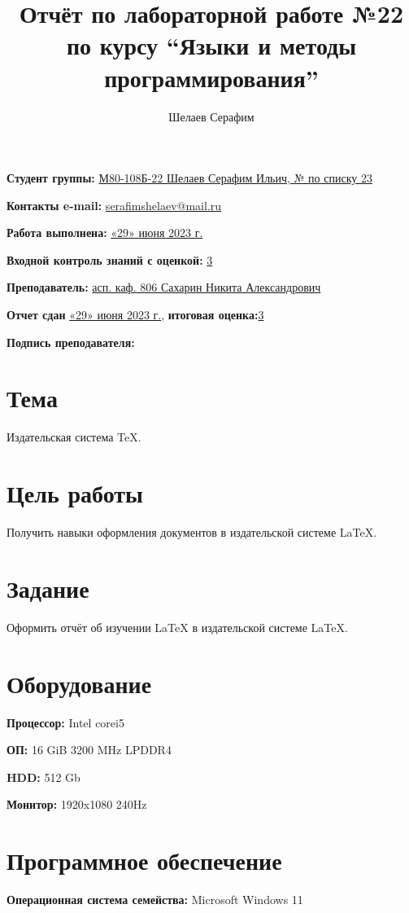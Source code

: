 \documentclass[12pt, letterpaper]{article}
\title{Отчёт по лабораторной работе №22 по курсу “Языки и методы программирования”}
\author{Шелаев Серафим}
\begin{document}
\maketitle
\begin{description}
\item\textbf{Студент группы:} \underline{М80-108Б-22 Шелаев Серафим Ильич, № по списку 23}    
\item\textbf{Контакты e-mail:} \underline{serafimshelaev@mail.ru}
\item\textbf{Работа выполнена:} \underline{«29» июня 2023 г.}
\item\textbf{Входной контроль знаний с оценкой:} \underline{3}
\item\textbf{Преподаватель:} \underline{асп. каф. 806 Сахарин Никита Александрович}
\item\textbf{Отчет сдан} \underline{«29» июня 2023 г.}, \textbf{итоговая оценка:}\underline{3}
\item\textbf{Подпись преподавателя:} \underline{\hspace{3cm}}
\end{description}
\newpage
\section{Тема}
Издательская система \TeX{}.
\section{Цель работы}
Получить навыки оформления документов в издательской системе \LaTeX{}.
\section{Задание}
Оформить отчёт об изучении \LaTeX{} в издательской системе \LaTeX{}.
\section{Оборудование}
\begin{description}
\item\textbf{Процессор:} Intel corei5
\item\textbf{ОП:} 16 GiB 3200 MHz LPDDR4
\item\textbf{HDD:} 512 Gb
\item\textbf{Монитор:} 1920x1080 240Hz
\end{description}
\section{Программное обеспечение}
\begin{description}
\item\textbf{Операционная система семейства:} Microsoft Windows 11 
\end{description}
\end{document}
